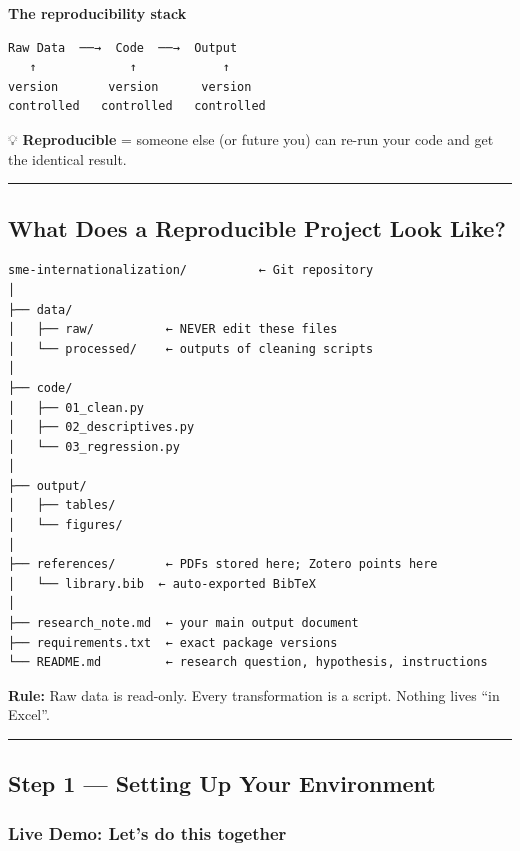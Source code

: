\documentclass[
  letterpaper,
  DIV=11,
  numbers=noendperiod]{scrartcl}
\begin{document}
\textbf{The reproducibility stack}

\begin{verbatim}
Raw Data  ──→  Code  ──→  Output
   ↑             ↑            ↑
version       version      version
controlled   controlled   controlled
\end{verbatim}

💡 \textbf{Reproducible} = someone else (or future you) can re-run your
code and get the identical result.

\begin{center}\rule{0.5\linewidth}{0.5pt}\end{center}

\subsection{What Does a Reproducible Project Look
Like?}\label{what-does-a-reproducible-project-look-like}

\begin{verbatim}
sme-internationalization/          ← Git repository
│
├── data/
│   ├── raw/          ← NEVER edit these files
│   └── processed/    ← outputs of cleaning scripts
│
├── code/
│   ├── 01_clean.py
│   ├── 02_descriptives.py
│   └── 03_regression.py
│
├── output/
│   ├── tables/
│   └── figures/
│
├── references/       ← PDFs stored here; Zotero points here
│   └── library.bib  ← auto-exported BibTeX
│
├── research_note.md  ← your main output document
├── requirements.txt  ← exact package versions
└── README.md         ← research question, hypothesis, instructions
\end{verbatim}

\textbf{Rule:} Raw data is read-only. Every transformation is a script.
Nothing lives ``in Excel''.

\begin{center}\rule{0.5\linewidth}{0.5pt}\end{center}

\subsection{Step 1 --- Setting Up Your
Environment}\label{step-1-setting-up-your-environment}

\subsubsection{Live Demo: Let's do this
together}\label{live-demo-lets-do-this-together}
\end{document}
